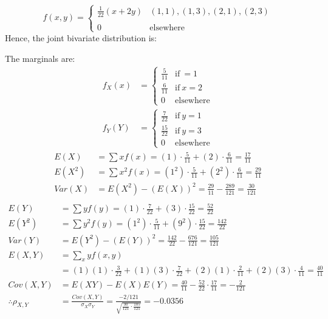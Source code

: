 \documentclass[12pt,a4paper, fleq]{article}
\begin{document}
\[
f(x,y) =
\begin{cases}
\frac{1}{22} (x+2y) & (1,1), (1, 3), (2, 1), (2, 3)\\
\\
0 & \mbox{elsewhere}
\end{cases}
\]
Hence, the joint bivariate distribution is:\\
\begin{table}[H]
\centering
{}
\end{table}
The marginals are:
\[
\begin{split}
f_X(x) & = \begin{cases}
\frac{5}{11} & \mbox{if}\: = 1\\
\frac{6}{11} & \mbox{if}\: x = 2\\
0 & \mbox{elsewhere}
\end{cases}\\
f_Y(Y) & = \begin{cases}
\frac{7}{22} & \mbox{if}\: y = 1\\
\frac{15}{22} & \mbox{if}\: y = 3\\
0 & \mbox{elsewhere}
\end{cases}
\end{split}
\]
\[
\begin{split}
E(X) & = \sum xf(x) = (1)\cdot\frac{5}{11} + (2)\cdot\frac{6}{11} = \frac{17}{11}\\[2mm]
E(X^2) & = \sum x^2f(x) = (1^2)\cdot\frac{5}{11} + (2^2)\cdot\frac{6}{11} = \frac{29}{11}\\[2mm]
Var(X) & = E(X^2) - \left(E(X)\right)^2 = \frac{29}{11} - \frac{289}{121} = \frac{30}{121}\\[5mm]
\end{split}
\]
\[
\begin{split}
E(Y) & = \sum yf(y) = (1)\cdot\frac{7}{22} + (3)\cdot\frac{15}{22} = \frac{52}{22}\\[2mm]
E(Y^2) & = \sum y^2f(y) = (1^2)\cdot\frac{5}{11} + (9^2)\cdot\frac{15}{22} = \frac{142}{22}\\[2mm]
Var(Y) & = E(Y^2) - \left(E(Y)\right)^2 = \frac{142}{22} - \frac{676}{121} = \frac{105}{121}\\[5mm]
E(X,Y) & = \sum_xyf(x,y)\\[2mm]
&= (1)(1)\cdot\frac{3}{22} + (1)(3)\cdot\frac{7}{22} + (2)(1)\cdot\frac{2}{11} + (2)(3)\cdot\frac{4}{11} = \frac{40}{11}\\[2mm]
Cov(X,Y) & = E(XY) - E(X)E(Y) = \frac{40}{11} - \frac{52}{22}\cdot \frac{17}{11} = -\frac{2}{121}\\[3mm]
\therefore \rho_{X,Y}& = \frac{Cov(X,Y)}{\sigma_X\sigma_Y} = \frac{-2/121}{\sqrt{\frac{30}{121}\cdot \frac{105}{121}}} = \mathbf{-0.0356}
\end{split}
\]
\end{document}
